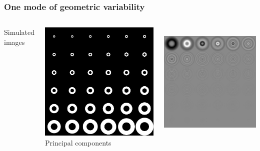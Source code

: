 %

\begin{frame}
\frametitle{One mode of geometric variability}
\begin{columns}[c]
Simulated images\par
\includegraphics[height=0.9\textwidth]{circles}
Principal components\par
\includegraphics[height=0.9\textwidth]{circles_pca}

\end{columns}
\end{frame}
